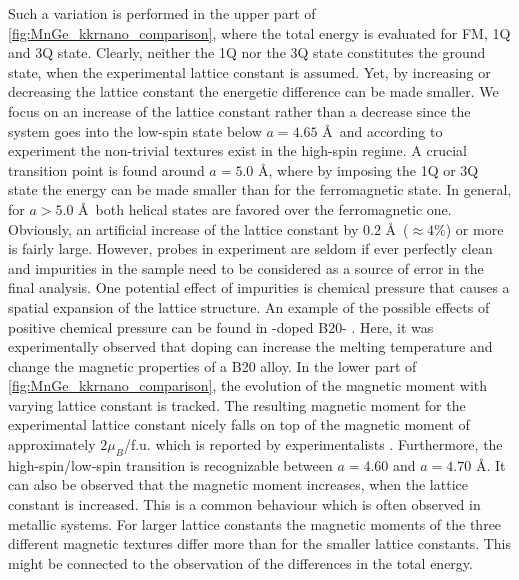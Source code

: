 \documentclass[graybox]{svmult}
\begin{document}
Such a variation is performed in the upper part of \cref{fig:MnGe_kkrnano_comparison}, where
the total energy is evaluated for FM, 1Q and 3Q state.
Clearly, neither the 1Q nor the 3Q state constitutes the ground state,
when the experimental lattice constant is assumed.
Yet, by increasing or decreasing the lattice constant the energetic difference can be made
smaller.
We focus on an increase of the lattice constant rather than a decrease since 
the system goes into the low-spin state below $a=4.65$ \AA \, \cite{rosler_ab_2012} and according to experiment
the non-trivial textures
exist in the high-spin regime.
A crucial transition point is found around $a=5.0$ \AA,
where by imposing the 1Q or 3Q state the energy can be made smaller than for the ferromagnetic state.
In general, for $a>5.0$ \AA \, both helical states are favored over the ferromagnetic one.
Obviously, an artificial increase of the lattice constant by
$0.2$ \AA \, ($\approx 4 \%$) or more is fairly large.
However, probes in experiment are seldom if ever perfectly clean and
impurities in the sample need to be considered as a source of error in the
final analysis. One potential
effect of impurities is chemical pressure that causes a spatial expansion of the
lattice structure.
An example of the possible effects of positive chemical pressure
can be found in -doped B20- \cite{stolt_chemical_2018}. 
Here, it was experimentally observed
that doping can increase the melting temperature and change the magnetic properties of a B20 alloy.
In the lower part of \cref{fig:MnGe_kkrnano_comparison}, the evolution of the magnetic moment
with varying lattice constant is tracked.
The resulting magnetic moment for the experimental lattice constant nicely falls 
on top of the magnetic moment of approximately $2 \mu_{B}$/f.u. 
which is reported by experimentalists \cite{yaouanc_magnetic_2017}.
Furthermore, the high-spin/low-spin transition is recognizable between $a=4.60$ and $a=4.70$ \AA.
It can also be observed that the magnetic moment increases, when the lattice constant is increased.
This is a common behaviour which is often observed in metallic systems.
For larger lattice constants the magnetic moments of the three different
magnetic textures differ more than for the smaller lattice constants.
This might be connected to the observation of the differences in the total energy.
\end{document}
